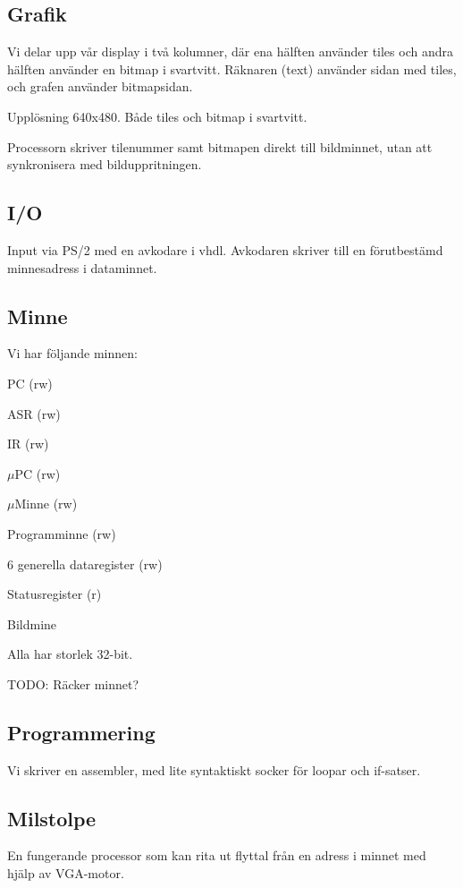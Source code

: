 \documentclass[]{article}
\begin{document}
\subsection{Grafik} 
Vi delar upp vår display i två kolumner, där ena hälften använder tiles och andra hälften använder en bitmap i svartvitt. Räknaren (text) använder sidan med tiles, och grafen använder bitmapsidan.

Upplösning 640x480. Både tiles och bitmap i svartvitt.

Processorn skriver tilenummer samt bitmapen direkt till bildminnet, utan att synkronisera med bilduppritningen.

\subsection{I/O}
Input via PS/2 med en avkodare i vhdl. Avkodaren skriver till en förutbestämd minnesadress i dataminnet.

\subsection{Minne}
Vi har följande minnen:
\begin{itemize*}
\item PC (rw)
\item ASR (rw)
\item IR (rw)
\item $\mu$PC (rw)
\item $\mu$Minne (rw)
\item Programminne (rw)
\item 6 generella dataregister (rw)
\item Statusregister (r)
\item Bildmine
\end{itemize*}
Alla har storlek 32-bit.

TODO: Räcker minnet?

\subsection{Programmering}
Vi skriver en assembler, med lite syntaktiskt socker för loopar och if-satser. 

\subsection{Milstolpe}
En fungerande processor som kan rita ut flyttal från en adress i minnet med hjälp av VGA-motor.
\end{document}

